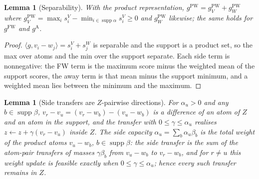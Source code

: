 \documentclass[pdflatex,sn-apa]{sn-jnl}%
\newtheorem{lemma}[theorem]{Lemma}
\theoremstyle{thmstyleone}
\newtheorem{lemma}[theorem]{Lemma}
\theoremstyle{thmstyletwo}
\newcommand{\ip}[2]{\langle #1, #2 \rangle}
\newcommand{\gFW}{g^{\mathrm{FW}}}
\newcommand{\gA}{g^{\mathrm{A}}}
\newcommand{\gPW}{g^{\mathrm{PW}}}
\begin{document}
\begin{lemma}[Separability]\label{lem:sep}
With the product representation, $\gPW=\gPW_V+\gPW_W$ where
$\gPW_V=\max_is^V_i-\min_{i\in\operatorname{supp}\alpha}s^V_i\ge0$ and
$\gPW_W$ likewise; the same holds for $\gFW$ and $\gA$.
\end{lemma}
\begin{proof}
$\ip{g}{v_i-w_j}=s^V_i+s^W_j$ is separable and the support is a product
set, so the max over atoms and the min over the support separate. Each
side term is nonnegative: the FW term is the maximum score minus the
weighted mean of the support scores, the away term is that mean minus
the support minimum, and a weighted mean lies between the minimum and
the maximum.
\end{proof}

\begin{lemma}[Side transfers are $Z$-pairwise directions]\label{lem:side}
For $\alpha_u>0$ and any $b\in\operatorname{supp}\beta$,
$v_r-v_u=(v_r-w_b)-(v_u-w_b)$ is a difference of an atom of $Z$ and an
atom in the support, and the transfer with $0\le\gamma\le\alpha_u$ realises
$z\leftarrow z+\gamma(v_r-v_u)$ inside $Z$. The side capacity
$\alpha_u=\sum_{b}\alpha_u\beta_b$ is the total weight of the product
atoms $v_u-w_b$, $b\in\operatorname{supp}\beta$: the side transfer is
the sum of the atom-pair transfers of masses $\gamma\beta_b$ from
$v_u-w_b$ to $v_r-w_b$, and for $r\ne u$ this weight update is feasible
exactly when $0\le\gamma\le\alpha_u$; hence every such transfer remains
in $Z$.
\end{lemma}
\end{document}
